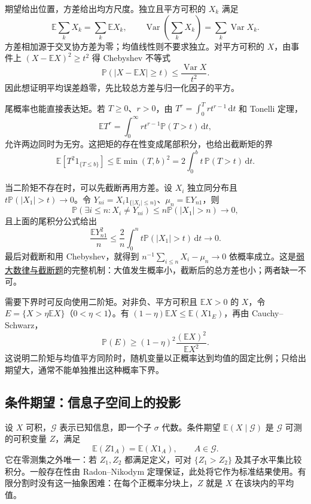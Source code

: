\documentclass[UTF8,12pt,a4paper,fontset=fandol]{ctexbook}
\begin{document}
期望给出位置，方差给出均方尺度。独立且平方可积的 $X_k$ 满足
\[
\mathbb E\sum_kX_k=\sum_k\mathbb EX_k,
\qquad
\operatorname{Var}\!\left(\sum_kX_k\right)=\sum_k\operatorname{Var}X_k.
\]
方差相加源于交叉协方差为零；均值线性则不要求独立。对平方可积的 $X$，由事件上 $(X-\mathbb EX)^2\ge t^2$ 得 Chebyshev 不等式
\[
\mathbb P(|X-\mathbb EX|\ge t)\le\frac{\operatorname{Var}X}{t^2}.
\]
因此想证明平均误差趋零，先比较总方差与归一化因子的平方。

尾概率也能直接表达矩。若 $T\ge0$、$r>0$，由 $T^r=\int_0^Trt^{r-1}\,\mathrm dt$ 和 Tonelli 定理，
\[
\mathbb ET^r=\int_0^\infty rt^{r-1}\mathbb P(T>t)\,\mathrm dt,
\]
允许两边同时为无穷。这把矩的存在性变成尾部积分，也给出截断矩的界
\[
\mathbb E[T^2 1_{\{T\le b\}}]\le\mathbb E\min(T,b)^2
=2\int_0^bt\,\mathbb P(T>t)\,\mathrm dt.
\]

当二阶矩不存在时，可以先截断再用方差。设 $X_i$ 独立同分布且 $t\mathbb P(|X_1|>t)\to0$。令 $Y_{ni}=X_i1_{\{|X_i|\le n\}}$、$\mu_n=\mathbb EY_{n1}$，则
\[
\mathbb P(\exists i\le n:X_i\ne Y_{ni})\le n\mathbb P(|X_1|>n)\to0,
\]
且上面的尾积分公式给出
\[
\frac{\mathbb EY_{n1}^2}{n}\le\frac2n\int_0^nt\mathbb P(|X_1|>t)\,\mathrm dt\to0.
\]
最后对截断和用 Chebyshev，就得到 $n^{-1}\sum_{i\le n}X_i-\mu_n\to0$ 依概率成立。这是\hyperref[pr:fin11-high:12]{弱大数律与截断题}的完整机制：大值发生概率小，截断后的总方差也小；两者缺一不可。

需要下界时可反向使用二阶矩。对非负、平方可积且 $\mathbb EX>0$ 的 $X$，令 $E=\{X>\eta\mathbb EX\}$（$0<\eta<1$）。有 $(1-\eta)\mathbb EX\le\mathbb E(X1_E)$，再由 Cauchy--Schwarz，
\[
\mathbb P(E)\ge(1-\eta)^2\frac{(\mathbb EX)^2}{\mathbb EX^2}.
\]
这说明二阶矩与均值平方同阶时，随机变量以正概率达到均值的固定比例；只给出期望大，通常不能单独推出这种概率下界。

\subsection{条件期望：信息子空间上的投影}

\label{app:probability-conditional}

设 $X$ 可积，$\mathcal G$ 表示已知信息，即一个子 $\sigma$ 代数。条件期望 $\mathbb E(X\mid\mathcal G)$ 是 $\mathcal G$ 可测的可积变量 $Z$，满足
\[
\mathbb E(Z1_A)=\mathbb E(X1_A),\qquad A\in\mathcal G.
\]
它在零测集之外唯一：若 $Z_1,Z_2$ 都满足定义，可对 $\{Z_1>Z_2\}$ 及其子水平集比较积分。一般存在性由 Radon--Nikodym 定理保证，此处将它作为标准结果使用。有限分割时没有这一抽象困难：在每个正概率分块上，$Z$ 就是 $X$ 在该块内的平均值。
\end{document}
